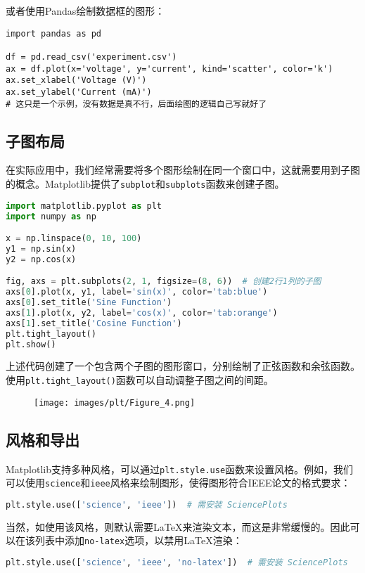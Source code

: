 \documentclass[../main.tex]{subfiles}
\begin{document}
或者使用Pandas绘制数据框的图形：
\begin{lstlisting}
import pandas as pd

df = pd.read_csv('experiment.csv')
ax = df.plot(x='voltage', y='current', kind='scatter', color='k')
ax.set_xlabel('Voltage (V)')
ax.set_ylabel('Current (mA)')
# 这只是一个示例，没有数据是真不行，后面绘图的逻辑自己写就好了
\end{lstlisting}

\subsection{子图布局}

在实际应用中，我们经常需要将多个图形绘制在同一个窗口中，这就需要用到子图的概念。Matplotlib提供了\texttt{subplot}和\texttt{subplots}函数来创建子图。

\begin{lstlisting}[language=python]
import matplotlib.pyplot as plt
import numpy as np

x = np.linspace(0, 10, 100)
y1 = np.sin(x)
y2 = np.cos(x)

fig, axs = plt.subplots(2, 1, figsize=(8, 6))  # 创建2行1列的子图
axs[0].plot(x, y1, label='sin(x)', color='tab:blue')
axs[0].set_title('Sine Function')
axs[1].plot(x, y2, label='cos(x)', color='tab:orange')
axs[1].set_title('Cosine Function')
plt.tight_layout()
plt.show()
\end{lstlisting}
上述代码创建了一个包含两个子图的图形窗口，分别绘制了正弦函数和余弦函数。\\使用\texttt{plt.tight\_layout()}函数可以自动调整子图之间的间距。

\begin{figure}[htbp]
  \centering
  \texttt{[image: images/plt/Figure\_4.png]}
\end{figure}

\subsection{风格和导出}

Matplotlib支持多种风格，可以通过\texttt{plt.style.use}函数来设置风格。例如，我们可以使用\texttt{science}和\texttt{ieee}风格来绘制图形，使得图形符合IEEE论文的格式要求：
\begin{lstlisting}[language=python]
plt.style.use(['science', 'ieee'])  # 需安装 SciencePlots
\end{lstlisting}
当然，如使用该风格，则默认需要LaTeX来渲染文本，而这是非常缓慢的。因此可以在该列表中添加\texttt{no-latex}选项，以禁用LaTeX渲染：
\begin{lstlisting}[language=python]
plt.style.use(['science', 'ieee', 'no-latex'])  # 需安装 SciencePlots
\end{lstlisting}
\end{document}
